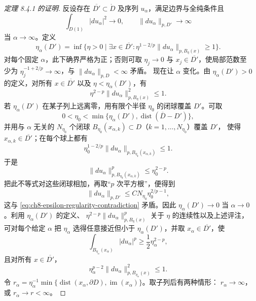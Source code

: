 \begin{proof}[定理 8.4.1 的证明]
反设存在 $\overline{D'}\subset\mathring D$ 及序列 $u_\alpha$，满足边界与全纯条件且
\begin{equation}
 \int_{D(1)}|du_\alpha|^2\to0,\qquad
 \|du_\alpha\|_{p,D'}\to\infty
 \label{eq:ch8-epsilon-regularity-contradiction}
\end{equation}
当 $\alpha\to\infty$。定义
\[
 \eta_\alpha(D')=\inf\{\eta>0\mid\exists x\in\overline{D'}:
 \eta^{1-2/p}\|du_\alpha\|_{p,B_\eta(x)}\geq1\}.
\]
对每个固定 $\alpha$，此下确界严格为正；否则可取
$\eta_j\to0$ 与 $x_j\in\overline{D'}$，使局部范数至少为
$\eta_j^{-1+2/p}\to\infty$，与 $\|du_\alpha\|_{p,D}<\infty$ 矛盾。
现在让 $\alpha$ 变化。由 $\eta_\alpha(D')>0$ 的定义，对所有
$x\in\overline{D'}$ 以及 $\eta<\eta_\alpha(D')$，有
\[
 \eta^{2-p}\|du_\alpha\|_{p,B_\eta(x)}^2\leq1.
\]
若 $\eta_\alpha(D')$ 在某子列上远离零，用有限个半径
$\eta_0$ 的闭球覆盖 $D'$。可取
\[
0<\eta_0<\min\{\eta_\alpha(D'),\operatorname{dist}(\overline D-D')\},
\]
并用与 $\alpha$ 无关的 $N_{\eta_0}$ 个闭球
$B_{\eta_0}(x_{\alpha,k})\subset D$（$k=1,\ldots,N_{\eta_0}$）覆盖 $D'$，
使得 $x_{\alpha,k}\in\overline{D'}$；在每个球上都有
\[
\eta_0^{1-2/p}\|du_\alpha\|_{p,B_{\eta_0}(x_{\alpha,k})}\leq1.
\]
于是
\[
 \|du_\alpha\|_{p,B_{\eta_0}(x_{\alpha,k})}^p\leq\eta_0^{2-p}.
\]
把此不等式对这些闭球相加，再取“$p$ 次平方根”，便得到
\[
 \|du_\alpha\|_{p,D'}\leq C N_{\eta_0}\eta_0^{2/p-1},
\]
这与
\eqref{eq:ch8-epsilon-regularity-contradiction} 矛盾。因此
$\eta_\alpha(D')\to0$ 当 $\alpha\to0$。利用 $\eta_\alpha(D')$ 的定义、
$\eta^{2-p}\|du_\alpha\|_{p,B_\eta(x)}^p$ 关于 $\eta$ 的连续性以及上述评注，
可对每个给定 $\alpha$ 把 $\eta_\alpha$ 选得任意接近但小于
$\eta_\alpha(D')$，并取
$x_\alpha\in\overline{D'}$，使
\begin{equation}
 \int_{B_{\eta_\alpha}(x_\alpha)}|du_\alpha|^p
 \geq\frac12\eta_\alpha^{2-p},
 \label{eq:ch8-rescaling-lower-bound}
\end{equation}
且对所有 $x\in\overline{D'}$，
\begin{equation}
 \eta_\alpha^{p-2}\|du_\alpha\|_{p,B_{\eta_\alpha}(x)}^2\leq1.
 \label{eq:ch8-rescaling-upper-bound}
\end{equation}
令
$r_\alpha=\eta_\alpha^{-1}\min\{\operatorname{dist}(x_\alpha,\partial D),
\operatorname{im}(x_\alpha)\}$。取子列后有两种情形：
$r_\alpha\to\infty$，或 $r_\alpha\to r<\infty$。


\end{proof}
